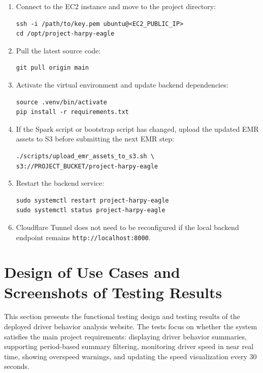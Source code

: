 \documentclass[12pt,a4paper]{article}
\begin{document}
\begin{enumerate}
    \item Connect to the EC2 instance and move to the project directory:
\begin{lstlisting}
ssh -i /path/to/key.pem ubuntu@<EC2_PUBLIC_IP>
cd /opt/project-harpy-eagle
\end{lstlisting}

    \item Pull the latest source code:
\begin{lstlisting}
git pull origin main
\end{lstlisting}

    \item Activate the virtual environment and update backend dependencies:
\begin{lstlisting}
source .venv/bin/activate
pip install -r requirements.txt
\end{lstlisting}

    \item If the Spark script or bootstrap script has changed, upload the updated EMR assets to S3 before submitting the next EMR step:
\begin{lstlisting}
./scripts/upload_emr_assets_to_s3.sh \
s3://PROJECT_BUCKET/project-harpy-eagle
\end{lstlisting}

    \item Restart the backend service:
\begin{lstlisting}
sudo systemctl restart project-harpy-eagle
sudo systemctl status project-harpy-eagle
\end{lstlisting}

    \item Cloudflare Tunnel does not need to be reconfigured if the local backend endpoint remains \texttt{http://localhost:8000}.
\end{enumerate}


\section{Design of Use Cases and Screenshots of Testing Results}

This section presents the functional testing design and testing results of the deployed driver behavior analysis website. The tests focus on whether the system satisfies the main project requirements: displaying driver behavior summaries, supporting period-based summary filtering, monitoring driver speed in near real time, showing overspeed warnings, and updating the speed visualization every 30 seconds.
\end{document}
